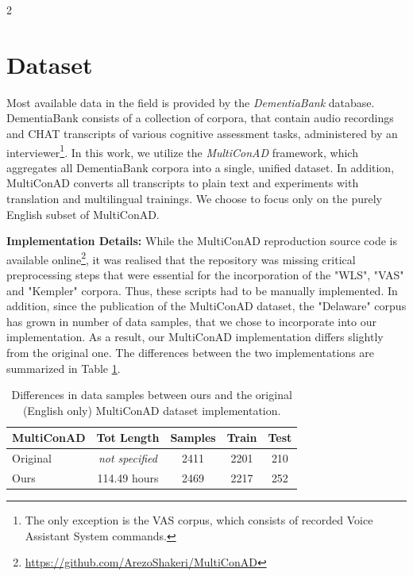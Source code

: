 \documentclass[10pt]{article}
\newcommand{\tpar}[1]{\par\textbf{#1: }}
\begin{document}
\begin{multicols}{2}
\section{Dataset}\label{sec:dataset}
\par Most available data in the field is provided by the
\emph{DementiaBank} \cite{lanziDementiaBankTheoreticalRationale2023} database.
DementiaBank consists of a collection of corpora, that contain audio recordings
and CHAT transcripts of various cognitive assessment tasks, administered by an
interviewer\footnote{The only exception is the VAS corpus, which consists of
recorded Voice Assistant System commands.}. In this work, we utilize the
\emph{MultiConAD} \cite{shakeriMultiConADUnifiedMultilingual2025} framework,
which aggregates all DementiaBank corpora into a single, unified dataset. In
addition, MultiConAD converts all transcripts to plain text and experiments
with translation and multilingual trainings. We choose to focus only on the
purely English subset of MultiConAD.

\tpar{Implementation Details} While the MultiConAD reproduction source code is
available online\footnote{\href{https://github.com/ArezoShakeri/MultiConAD}{https://github.com/ArezoShakeri/MultiConAD}}, it was
realised that the repository was missing critical preprocessing steps that were
essential for the incorporation of the "WLS", "VAS" and "Kempler" corpora. Thus,
these scripts had to be manually implemented. In addition, since the
publication of the MultiConAD dataset, the "Delaware" corpus has grown in
number of data samples, that we chose to incorporate into our implementation.
As a result, our MultiConAD implementation differs slightly from the original
one. The differences between the two implementations are summarized in Table
\ref{tab:impl}.

\begin{table}[H]
	\centering
	\small
	\begin{tabular}{l c c c c}
		\toprule
		\textbf{MultiConAD} & \textbf{Tot Length} & \textbf{Samples} &
		\textbf{Train} & \textbf{Test} \\
		\midrule
		Original & \textit{not specified} & 2411 & 2201 & 210 \\
		Ours & 114.49 hours & 2469 & 2217 & 252 \\
		\bottomrule
	\end{tabular}
	\caption{Differences in data samples between ours and the original (English
	only) MultiConAD dataset implementation.}
	\label{tab:impl}
\end{table}


\end{multicols}
\end{document}
